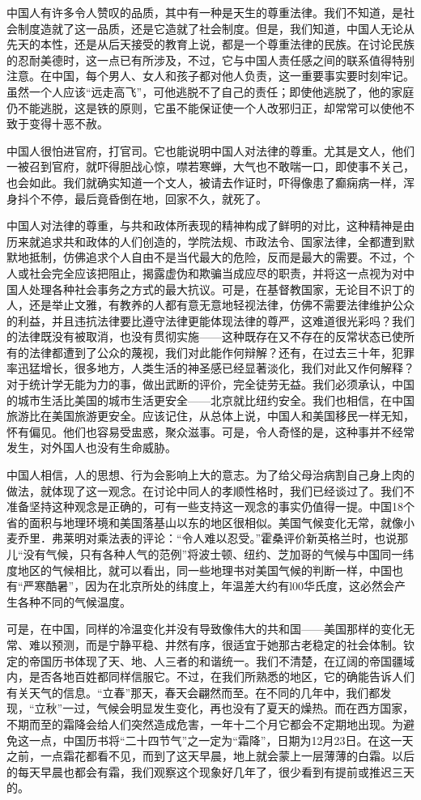 \documentclass[12pt,oneside]{book}
\begin{document}
\begin{common-format}
中国人有许多令人赞叹的品质，其中有一种是天生的尊重法律。我们不知道，是社会制度造就了这一品质，还是它造就了社会制度。但是，我们知道，中国人无论从先天的本性，还是从后天接受的教育上说，都是一个尊重法律的民族。在讨论民族的忍耐美德时，这一点已有所涉及，不过，它与中国人责任感之间的联系值得特别注意。在中国，每个男人、女人和孩子都对他人负责，这一重要事实要时刻牢记。虽然一个人应该“远走高飞”，可他逃脱不了自己的责任；即使他逃脱了，他的家庭仍不能逃脱，这是铁的原则，它虽不能保证使一个人改邪归正，却常常可以使他不致于变得十恶不赦。 

中国人很怕进官府，打官司。它也能说明中国人对法律的尊重。尤其是文人，他们一被召到官府，就吓得胆战心惊，噤若寒蝉，大气也不敢喘一口，即使事不关己，也会如此。我们就确实知道一个文人，被请去作证时，吓得像患了癫痫病一样，浑身抖个不停，最后竟昏倒在地，回家不久，就死了。 

中国人对法律的尊重，与共和政体所表现的精神构成了鲜明的对比，这种精神是由历来就追求共和政体的人们创造的，学院法规、市政法令、国家法律，全都遭到默默地抵制，仿佛追求个人自由不是当代最大的危险，反而是最大的需要。不过，个人或社会完全应该把阻止，揭露虚伪和欺骗当成应尽的职责，并将这一点视为对中国人处理各种社会事务之方式的最大抗议。可是，在基督教国家，无论目不识丁的人，还是举止文雅，有教养的人都有意无意地轻视法律，仿佛不需要法律维护公众的利益，并且违抗法律要比遵守法律更能体现法律的尊严，这难道很光彩吗？我们的法律既没有被取消，也没有贯彻实施——这种既存在又不存在的反常状态已使所有的法律都遭到了公众的蔑视，我们对此能作何辩解？还有，在过去三十年，犯罪率迅猛增长，很多地方，人类生活的神圣感已经显著淡化，我们对此又作何解释？对于统计学无能为力的事，做出武断的评价，完全徒劳无益。我们必须承认，中国的城市生活比美国的城市生活更安全——北京就比纽约安全。我们也相信，在中国旅游比在美国旅游更安全。应该记住，从总体上说，中国人和美国移民一样无知，怀有偏见。他们也容易受盅惑，聚众滋事。可是，令人奇怪的是，这种事并不经常发生，对外国人也没有生命威胁。 

中国人相信，人的思想、行为会影响上大的意志。为了给父母治病割自己身上肉的做法，就体现了这一观念。在讨论中同人的孝顺性格时，我们已经谈过了。我们不准备坚持这种观念是正确的，可有一些支持这一观念的事实仍值得一提。中国18个省的面积与地理环境和美国落基山以东的地区很相似。美国气候变化无常，就像小麦乔里．弗莱明对乘法表的评论：“令人难以忍受。”霍桑评价新英格兰时，也说那儿“没有气候，只有各种人气的范例”将波士顿、纽约、芝加哥的气候与中国同一纬度地区的气候相比，就可以看出，同一些地理书对美国气候的判断一样，中国也有“严寒酷暑”，因为在北京所处的纬度上，年温差大约有l00华氏度，这必然会产生各种不同的气候温度。 

可是，在中国，同样的冷温变化并没有导致像伟大的共和国——美国那样的变化无常、难以预测，而是宁静平稳、井然有序，很适宜于她那古老稳定的社会体制。钦定的帝国历书体现了天、地、人三者的和谐统一。我们不清楚，在辽阔的帝国疆域内，是否各地百姓都同样信服它。不过，在我们所熟悉的地区，它的确能告诉人们有关天气的信息。“立春”那天，春天会翩然而至。在不同的几年中，我们都发现，“立秋”一过，气候会明显发生变化，再也没有了夏天的燥热。而在西方国家，不期而至的霜降会给人们突然造成危害，一年十二个月它都会不定期地出现。为避免这一点，中国历书将“二十四节气”之一定为“霜降”，日期为12月23日。在这一天之前，一点霜花都看不见，而到了这天早晨，地上就会蒙上一层薄薄的白霜。以后的每天早晨也都会有霜，我们观察这个现象好几年了，很少看到有提前或推迟三天的。 


\end{common-format}
\end{document}
